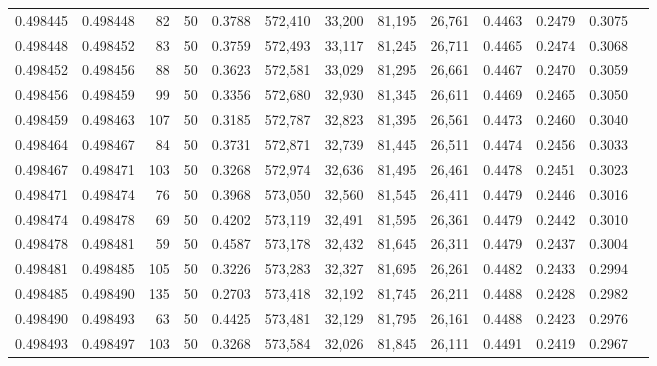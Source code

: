 \begin{tabular}{rrrrrrrrrrrrr}
0.498445 & 0.498448 &    82 &  50 &                                     0.3788 & 572,410 &  33,200 &  81,195 &  26,761 & 0.4463 & 0.2479 & 0.3075 \\
0.498448 & 0.498452 &    83 &  50 &                                     0.3759 & 572,493 &  33,117 &  81,245 &  26,711 & 0.4465 & 0.2474 & 0.3068 \\
0.498452 & 0.498456 &    88 &  50 &                                     0.3623 & 572,581 &  33,029 &  81,295 &  26,661 & 0.4467 & 0.2470 & 0.3059 \\
0.498456 & 0.498459 &    99 &  50 &                                     0.3356 & 572,680 &  32,930 &  81,345 &  26,611 & 0.4469 & 0.2465 & 0.3050 \\
0.498459 & 0.498463 &   107 &  50 &                                     0.3185 & 572,787 &  32,823 &  81,395 &  26,561 & 0.4473 & 0.2460 & 0.3040 \\
0.498464 & 0.498467 &    84 &  50 &                                     0.3731 & 572,871 &  32,739 &  81,445 &  26,511 & 0.4474 & 0.2456 & 0.3033 \\
0.498467 & 0.498471 &   103 &  50 &                                     0.3268 & 572,974 &  32,636 &  81,495 &  26,461 & 0.4478 & 0.2451 & 0.3023 \\
0.498471 & 0.498474 &    76 &  50 &                                     0.3968 & 573,050 &  32,560 &  81,545 &  26,411 & 0.4479 & 0.2446 & 0.3016 \\
0.498474 & 0.498478 &    69 &  50 &                                     0.4202 & 573,119 &  32,491 &  81,595 &  26,361 & 0.4479 & 0.2442 & 0.3010 \\
0.498478 & 0.498481 &    59 &  50 &                                     0.4587 & 573,178 &  32,432 &  81,645 &  26,311 & 0.4479 & 0.2437 & 0.3004 \\
0.498481 & 0.498485 &   105 &  50 &                                     0.3226 & 573,283 &  32,327 &  81,695 &  26,261 & 0.4482 & 0.2433 & 0.2994 \\
0.498485 & 0.498490 &   135 &  50 &                                     0.2703 & 573,418 &  32,192 &  81,745 &  26,211 & 0.4488 & 0.2428 & 0.2982 \\
0.498490 & 0.498493 &    63 &  50 &                                     0.4425 & 573,481 &  32,129 &  81,795 &  26,161 & 0.4488 & 0.2423 & 0.2976 \\
0.498493 & 0.498497 &   103 &  50 &                                     0.3268 & 573,584 &  32,026 &  81,845 &  26,111 & 0.4491 & 0.2419 & 0.2967 \\

\end{tabular}
